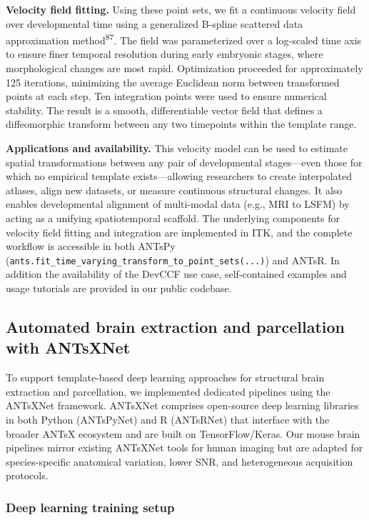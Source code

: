 \documentclass[
  12pt,
]{article}
\begin{document}
\textbf{Velocity field fitting.} Using these point sets, we fit a
continuous velocity field over developmental time using a generalized
B-spline scattered data approximation method\textsuperscript{87}. The
field was parameterized over a log-scaled time axis to ensure finer
temporal resolution during early embryonic stages, where morphological
changes are most rapid. Optimization proceeded for approximately 125
iterations, minimizing the average Euclidean norm between transformed
points at each step. Ten integration points were used to ensure
numerical stability. The result is a smooth, differentiable vector field
that defines a diffeomorphic transform between any two timepoints within
the template range.

\textbf{Applications and availability.} This velocity model can be used
to estimate spatial transformations between any pair of developmental
stages---even those for which no empirical template exists---allowing
researchers to create interpolated atlases, align new datasets, or
measure continuous structural changes. It also enables developmental
alignment of multi-modal data (e.g., MRI to LSFM) by acting as a
unifying spatiotemporal scaffold. The underlying components for velocity
field fitting and integration are implemented in ITK, and the complete
workflow is accessible in both ANTsPy
(\texttt{ants.fit\_time\_varying\_transform\_to\_point\_sets(...)}) and
ANTsR. In addition the availability of the DevCCF use case,
self-contained examples and usage tutorials are provided in our public
codebase.

\subsection{Automated brain extraction and parcellation with
ANTsXNet}\label{automated-brain-extraction-and-parcellation-with-antsxnet}

To support template-based deep learning approaches for structural brain
extraction and parcellation, we implemented dedicated pipelines using
the ANTsXNet framework. ANTsXNet comprises open-source deep learning
libraries in both Python (ANTsPyNet) and R (ANTsRNet) that interface
with the broader ANTsX ecosystem and are built on TensorFlow/Keras. Our
mouse brain pipelines mirror existing ANTsXNet tools for human imaging
but are adapted for species-specific anatomical variation, lower SNR,
and heterogeneous acquisition protocols.

\subsubsection{Deep learning training
setup}\label{deep-learning-training-setup}
\end{document}
